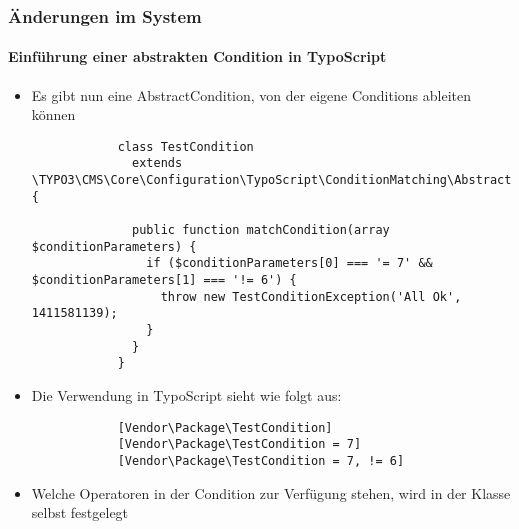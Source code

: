 
\begin{frame}[fragile]
	\frametitle{Änderungen im System}
	\framesubtitle{Einführung einer abstrakten Condition in TypoScript}

	\lstset{
		basicstyle=\tiny\ttfamily
	}

	\begin{itemize}
		\item Es gibt nun eine AbstractCondition, von der eigene Conditions ableiten können

		\begin{lstlisting}
			class TestCondition
			  extends \TYPO3\CMS\Core\Configuration\TypoScript\ConditionMatching\AbstractCondition {

			  public function matchCondition(array $conditionParameters) {
 			    if ($conditionParameters[0] === '= 7' && $conditionParameters[1] === '!= 6') {
			      throw new TestConditionException('All Ok', 1411581139);
			    }
			  }
			}
		\end{lstlisting}

		\item Die Verwendung in TypoScript sieht wie folgt aus:

		\begin{lstlisting}
			[Vendor\Package\TestCondition]
			[Vendor\Package\TestCondition = 7]
			[Vendor\Package\TestCondition = 7, != 6]
		\end{lstlisting}

		\item Welche Operatoren in der Condition zur Verfügung stehen, wird in der Klasse selbst festgelegt

	\end{itemize}

\end{frame}


